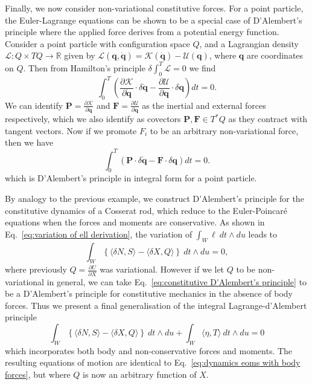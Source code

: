 Finally, we now consider non-variational constitutive forces. For a point particle, the Euler-Lagrange equations can be shown to be a special case of D'Alembert's principle where the applied force derives from a potential energy function. Consider a point particle with configuration space $Q$, and a Lagrangian density $\mathcal{L} : Q \times TQ \to \mathbb{R}$ given by $\mathcal{L}(\mathbf{q}, \dot{\mathbf{q}}) = \mathcal{K}(\dot{\mathbf{q}}) - \mathcal{U}(\mathbf{q})$, where $\mathbf{q}$ are coordinates on $Q$. Then from Hamilton's principle $\delta \int_0^T \mathcal{L} = 0$ we find
\begin{equation}
\int_0^T \left(  \frac{\partial \mathcal{K}}{\partial \dot{\mathbf{q}}} \cdot \delta \dot{\mathbf{q}}  - \frac{\partial \mathcal{U}}{\partial \mathbf{q}} \cdot \delta \mathbf{q} \right) dt = 0.
\end{equation}
We can identify $\mathbf{P} = \frac{\partial \mathcal{K}}{\partial \dot{\mathbf{q}}}$ and $\mathbf{F} = \frac{\partial \mathcal{U}}{\partial \mathbf{q}}$ as the inertial and external forces respectively, which we also identify as covectors $\mathbf{P}, \mathbf{F} \in T^*Q$ as they contract with tangent vectors. Now if we promote $F_i$ to be an arbitrary non-variational force, then we have
\begin{equation}
\int_0^T \left(  \mathbf{P} \cdot \delta \dot{\mathbf{q}}  - \mathbf{F} \cdot \delta \mathbf{q} \right) dt = 0.
\end{equation}
which is D'Alembert's principle in integral form for a point particle.

By analogy to the previous example, we construct D'Alembert's principle for the constitutive dynamics of a Cosserat rod, which reduce to the Euler-Poincaré equations when the forces and moments are conservative. As shown in Eq.~\ref{eq:variation of ell derivation}, the variation of $\int_W \ell\ dt \wedge du$ leads to
\begin{equation} \label{eq:constitutive D'Alembert's principle}
\int_W \left\{ \langle \delta N, S \rangle - \langle \delta X, Q \rangle \right\}\ dt \wedge du = 0,
\end{equation}
where previously $Q = \frac{\partial U}{\partial X}$ was variational. However if we let $Q$ to be non-variational in general, we can take Eq.~\ref{eq:constitutive D'Alembert's principle} to be a D'Alembert's principle for constitutive mechanics in the absence of body forces. Thus we present a final generalisation of the integral Lagrange-d'Alembert principle
\begin{equation} \label{eq:lagrange-dalembert for non-monogenic constitutive forces and body forces}
\int_W \left\{ \langle \delta N, S \rangle - \langle \delta X, Q \rangle \right\}\ dt \wedge du + \int_W \langle \eta, T \rangle \ dt \wedge du  = 0
\end{equation}
which incorporates both body and non-conservative forces and moments. The resulting equations of motion are identical to Eq.~\ref{eq:dynamics eoms with body forces}, but where $Q$ is now an arbitrary function of $X$.


